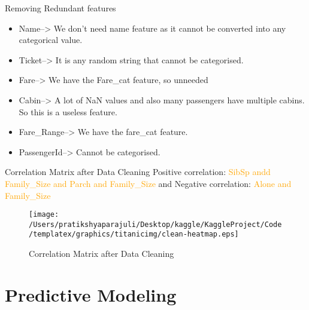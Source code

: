 \documentclass[
 size=14pt,
 paper=smartboard,  %
 mode=present, 		%
 display=slides, 	%
 style=tuliplab,  	%
 pauseslide,
 fleqn,leqno]{powerdot}
\begin{document}
\begin{slide}{Removing Redundant features}
\begin{itemize}
\item
  Name--> We don't need name feature as it cannot be converted into any categorical value.
  \item
  Ticket--> It is any random string that cannot be categorised.
  \item
  Fare--> We have the Fare_cat feature, so unneeded
  \item
   Cabin--> A lot of NaN values and also many passengers have multiple cabins. So this is a useless feature.
  \item
   Fare_Range--> We have the fare_cat feature.
  \item
  PassengerId--> Cannot be categorised.
\end{itemize}
\end{slide}
\begin{slide}{Correlation Matrix after Data Cleaning}
  Positive correlation: \textcolor{orange}{SibSp andd Family_Size and Parch and Family_Size} and Negative correlation: \textcolor{orange}{Alone and Family_Size}
   \begin{figure}
     \centering
     \centerline{\texttt{[image: /Users/pratikshyaparajuli/Desktop/kaggle/KaggleProject/Code/templatex/graphics/titanicimg/clean-heatmap.eps]}}
     \caption{Correlation Matrix after Data Cleaning}\label{fig:clean-Heat map}
   \end{figure}
   \end{slide}

\section{Predictive Modeling}
\end{document}
